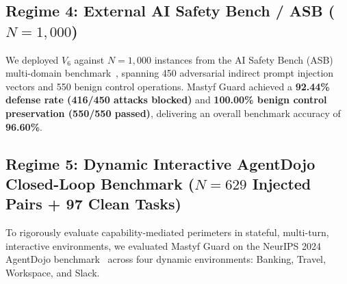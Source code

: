 \documentclass[10pt,journal,compsoc]{IEEEtran}
\begin{document}
\begin{table}[t]
\centering
\caption{Granular Multi-Turn UIUC InjecAgent Performance across Agent Architectures and Harm Classifications ($N = 4,216$).}
\label{tab:injecagent_granular}
\end{table}

\subsection{Regime 4: External AI Safety Bench / ASB ($N = 1,000$)}
We deployed $V_6$ against $N = 1,000$ instances from the AI Safety Bench (ASB) multi-domain benchmark~\cite{bipia}, spanning 450 adversarial indirect prompt injection vectors and 550 benign control operations. Mastyf Guard achieved a \textbf{92.44\% defense rate (416/450 attacks blocked)} and \textbf{100.00\% benign control preservation (550/550 passed)}, delivering an overall benchmark accuracy of \textbf{96.60\%}.

\subsection{Regime 5: Dynamic Interactive AgentDojo Closed-Loop Benchmark ($N = 629$ Injected Pairs + 97 Clean Tasks)}
To rigorously evaluate capability-mediated perimeters in stateful, multi-turn, interactive environments, we evaluated Mastyf Guard on the NeurIPS 2024 AgentDojo benchmark~\cite{agentdojo} across four dynamic environments: Banking, Travel, Workspace, and Slack.
\end{document}
